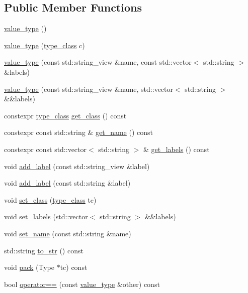 \subsection*{Public Member Functions}
\begin{DoxyCompactItemize}
\item 
\hyperlink{classtelegraph_1_1value__type_a70977f8232886ae5580663fc26395211}{value\+\_\+type} ()
\item 
\hyperlink{classtelegraph_1_1value__type_a1c509cad0f8ae29464da6f71137cbb68}{value\+\_\+type} (\hyperlink{classtelegraph_1_1value__type_a516081c0a4e231cb22554f48f052ff6f}{type\+\_\+class} c)
\item 
\hyperlink{classtelegraph_1_1value__type_a66464cefb3475452910c7ae5be643b6b}{value\+\_\+type} (const std\+::string\+\_\+view \&name, const std\+::vector$<$ std\+::string $>$ \&labels)
\item 
\hyperlink{classtelegraph_1_1value__type_ae80f832e65a0f7fb875bfe6ca5c2c7fc}{value\+\_\+type} (const std\+::string\+\_\+view \&name, std\+::vector$<$ std\+::string $>$ \&\&labels)
\item 
constexpr \hyperlink{classtelegraph_1_1value__type_a516081c0a4e231cb22554f48f052ff6f}{type\+\_\+class} \hyperlink{classtelegraph_1_1value__type_ab80f725bc93dca1e52a76f9a0fff45df}{get\+\_\+class} () const
\item 
constexpr const std\+::string \& \hyperlink{classtelegraph_1_1value__type_ad15335caeeff4d4a2e5499b28f126427}{get\+\_\+name} () const
\item 
constexpr const std\+::vector$<$ std\+::string $>$ \& \hyperlink{classtelegraph_1_1value__type_a481d2ba1e7ad3307a93481cb3e06b192}{get\+\_\+labels} () const
\item 
void \hyperlink{classtelegraph_1_1value__type_afcf8bd9842356bc6818b986fe3cf6025}{add\+\_\+label} (const std\+::string\+\_\+view \&label)
\item 
void \hyperlink{classtelegraph_1_1value__type_ac591946a9956e9429457ee198fb565c1}{add\+\_\+label} (const std\+::string \&label)
\item 
void \hyperlink{classtelegraph_1_1value__type_ab8e6a14a043a02360d13124c5fd3fed2}{set\+\_\+class} (\hyperlink{classtelegraph_1_1value__type_a516081c0a4e231cb22554f48f052ff6f}{type\+\_\+class} tc)
\item 
void \hyperlink{classtelegraph_1_1value__type_a0a83a299a45e7ef3c2439c85540a1731}{set\+\_\+labels} (std\+::vector$<$ std\+::string $>$ \&\&labels)
\item 
void \hyperlink{classtelegraph_1_1value__type_a633f12a04ff6a15e46f6495aaa6dc0da}{set\+\_\+name} (const std\+::string \&name)
\item 
std\+::string \hyperlink{classtelegraph_1_1value__type_a59f254ed2dcb92ecb9ba85b4d3ef8e68}{to\+\_\+str} () const
\item 
void \hyperlink{classtelegraph_1_1value__type_a34d5c460357b088d0c11497d8f93088b}{pack} (Type $\ast$tc) const
\item 
bool \hyperlink{classtelegraph_1_1value__type_a9a30339ab46ea67c279414318ecf041d}{operator==} (const \hyperlink{classtelegraph_1_1value__type}{value\+\_\+type} \&other) const
\end{DoxyCompactItemize}
